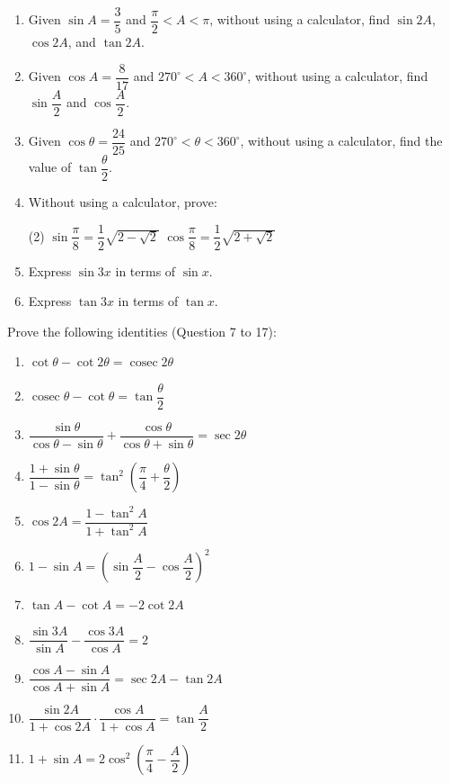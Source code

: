 \documentclass{report}
\begin{document}
\begin{enumerate}
	\item Given $\sin A=\dfrac{3}{5}$ and $\dfrac{\pi}{2}<A<\pi$, without using a calculator, find $\sin 2A$, $\cos 2A$, and $\tan 2A$.
	\item Given $\cos A=\dfrac{8}{17}$ and $270^{\circ}<A<360^{\circ}$, without using a calculator, find $\sin \dfrac{A}{2}$ and $\cos \dfrac{A}{2}$.
	\item Given $\cos \theta=\dfrac{24}{25}$ and $270^{\circ}<\theta<360^{\circ}$, without using a calculator, find the value of $\tan \dfrac{\theta}{2}$.
	\item Without using a calculator, prove:
	      \begin{tasks}[label=(\alph*)](2)
	      	\task $\sin \dfrac{\pi}{8}=\dfrac{1}{2} \sqrt{2-\sqrt{2}}$
	      	\task $\cos \dfrac{\pi}{8}=\dfrac{1}{2} \sqrt{2+\sqrt{2}}$
	      \end{tasks}
	\item Express $\sin 3x$ in terms of $\sin x$.
	\item Express $\tan 3x$ in terms of $\tan x$.
\end{enumerate}

\vspace{-1em}
Prove the following identities (Question 7 to 17):
\vspace{-1em}
\begin{enumerate}[start=7]
	\item $\cot \theta-\cot 2 \theta=\operatorname{cosec} 2 \theta$
	\item $\operatorname{cosec} \theta-\cot \theta=\tan \dfrac{\theta}{2}$
	\item $\dfrac{\sin \theta}{\cos \theta-\sin \theta}+\dfrac{\cos \theta}{\cos \theta+\sin \theta}=\sec 2 \theta$
	\item $\dfrac{1+\sin \theta}{1-\sin \theta}=\tan ^2\left(\dfrac{\pi}{4}+\dfrac{\theta}{2}\right)$
	\item $\cos 2 A=\dfrac{1-\tan ^2 A}{1+\tan ^2 A}$
	\item $1-\sin A=\left(\sin \dfrac{A}{2}-\cos \dfrac{A}{2}\right)^2$
	\item $\tan A-\cot A=-2 \cot 2 A$
	\item $\dfrac{\sin 3 A}{\sin A}-\dfrac{\cos 3 A}{\cos A}=2$
	\item $\dfrac{\cos A-\sin A}{\cos A+\sin A}=\sec 2 A-\tan 2 A$
	\item $\dfrac{\sin 2 A}{1+\cos 2 A} \cdot \dfrac{\cos A}{1+\cos A}=\tan \dfrac{A}{2}$
	\item $1+\sin A=2 \cos ^2\left(\dfrac{\pi}{4}-\dfrac{A}{2}\right)$
\end{enumerate}
\end{document}

